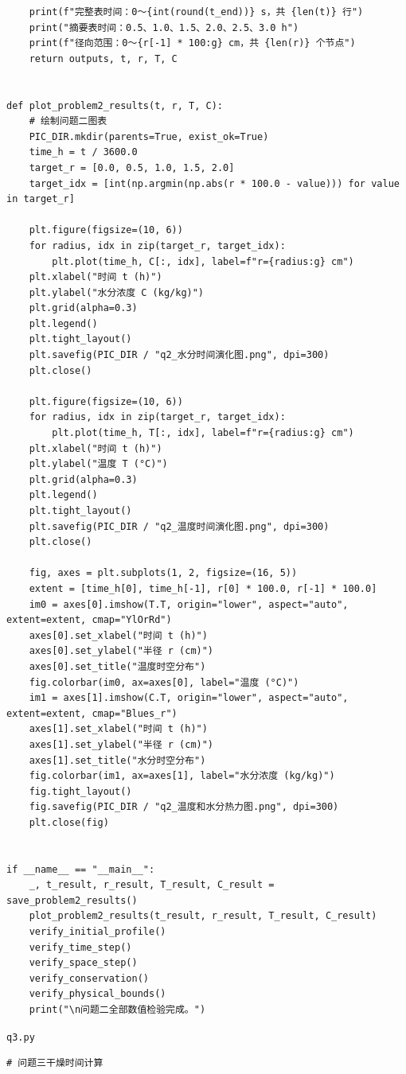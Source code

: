 \documentclass[withoutpreface,bwprint]{cumcm_thesis}
\begin{document}
\begin{appendices}
\begin{lstlisting}
    print(f"完整表时间：0～{int(round(t_end))} s，共 {len(t)} 行")
    print("摘要表时间：0.5、1.0、1.5、2.0、2.5、3.0 h")
    print(f"径向范围：0～{r[-1] * 100:g} cm，共 {len(r)} 个节点")
    return outputs, t, r, T, C


def plot_problem2_results(t, r, T, C):
    # 绘制问题二图表
    PIC_DIR.mkdir(parents=True, exist_ok=True)
    time_h = t / 3600.0
    target_r = [0.0, 0.5, 1.0, 1.5, 2.0]
    target_idx = [int(np.argmin(np.abs(r * 100.0 - value))) for value in target_r]

    plt.figure(figsize=(10, 6))
    for radius, idx in zip(target_r, target_idx):
        plt.plot(time_h, C[:, idx], label=f"r={radius:g} cm")
    plt.xlabel("时间 t (h)")
    plt.ylabel("水分浓度 C (kg/kg)")
    plt.grid(alpha=0.3)
    plt.legend()
    plt.tight_layout()
    plt.savefig(PIC_DIR / "q2_水分时间演化图.png", dpi=300)
    plt.close()

    plt.figure(figsize=(10, 6))
    for radius, idx in zip(target_r, target_idx):
        plt.plot(time_h, T[:, idx], label=f"r={radius:g} cm")
    plt.xlabel("时间 t (h)")
    plt.ylabel("温度 T (°C)")
    plt.grid(alpha=0.3)
    plt.legend()
    plt.tight_layout()
    plt.savefig(PIC_DIR / "q2_温度时间演化图.png", dpi=300)
    plt.close()

    fig, axes = plt.subplots(1, 2, figsize=(16, 5))
    extent = [time_h[0], time_h[-1], r[0] * 100.0, r[-1] * 100.0]
    im0 = axes[0].imshow(T.T, origin="lower", aspect="auto", extent=extent, cmap="YlOrRd")
    axes[0].set_xlabel("时间 t (h)")
    axes[0].set_ylabel("半径 r (cm)")
    axes[0].set_title("温度时空分布")
    fig.colorbar(im0, ax=axes[0], label="温度 (°C)")
    im1 = axes[1].imshow(C.T, origin="lower", aspect="auto", extent=extent, cmap="Blues_r")
    axes[1].set_xlabel("时间 t (h)")
    axes[1].set_ylabel("半径 r (cm)")
    axes[1].set_title("水分时空分布")
    fig.colorbar(im1, ax=axes[1], label="水分浓度 (kg/kg)")
    fig.tight_layout()
    fig.savefig(PIC_DIR / "q2_温度和水分热力图.png", dpi=300)
    plt.close(fig)


if __name__ == "__main__":
    _, t_result, r_result, T_result, C_result = save_problem2_results()
    plot_problem2_results(t_result, r_result, T_result, C_result)
    verify_initial_profile()
    verify_time_step()
    verify_space_step()
    verify_conservation()
    verify_physical_bounds()
    print("\n问题二全部数值检验完成。")

\end{lstlisting}
\noindent\texttt{q3.py}
\begin{lstlisting}
# 问题三干燥时间计算


\end{lstlisting}
\end{appendices}
\end{document}
